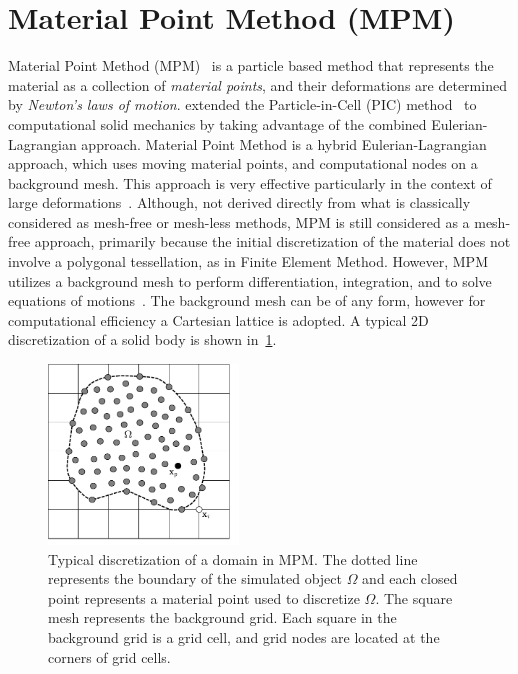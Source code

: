 \section{Material Point Method (MPM)}
Material Point Method (MPM)~\citep{Sulsky1994,Sulsky1995} is a particle based 
method that represents the material as a collection of \textit{material 
points}, and their deformations are determined by \textit{Newton's laws of 
motion}. \citet{Sulsky1994} extended the Particle-in-Cell (PIC) 
method~\citep{harlow1964} to computational solid mechanics by taking advantage 
of the combined Eulerian-Lagrangian approach. Material Point Method is a hybrid 
Eulerian-Lagrangian approach, which uses moving material points, and 
computational nodes on a background mesh. This approach is very effective 
particularly in the context of large 
deformations~\citep{mackenzie2010,shin2010}. Although, not derived directly 
from what is classically considered as mesh-free or mesh-less methods, MPM is 
still considered as a mesh-free approach, primarily because the initial 
discretization of the material does not involve a polygonal tessellation, as in 
Finite Element Method. However, MPM utilizes a background mesh to perform 
differentiation, integration, and to solve equations of 
motions~\citep{Steffen2008}. The background mesh can be of any form, however 
for computational efficiency a Cartesian lattice is adopted. A typical 2D 
discretization of a solid body is shown in~\cref{fig:MPM}. 

\begin{figure}
\centering
\includegraphics[width=0.45\textwidth]{MPM}
\caption[Typical discretization of a domain in MPM]{Typical discretization of a 
domain in MPM. The dotted line represents the boundary of the simulated object 
$\Omega$ and each closed point represents a material point used to discretize 
$\Omega$. The square mesh represents the background grid. Each square in the 
background grid is a grid cell, and grid nodes are located at the corners of 
grid cells.}
\label{fig:MPM}
\end{figure}

